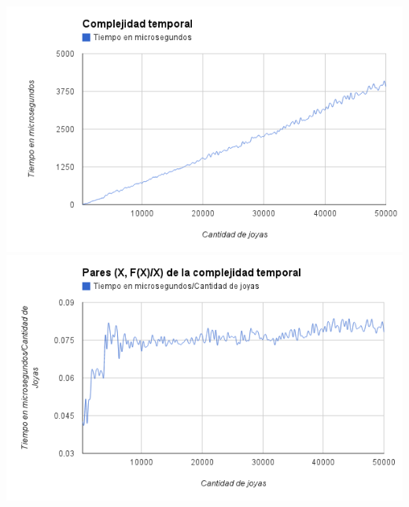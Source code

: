 \begin{center}
	\includegraphics[scale=0.60]{images/ej2_fx.png}
	\includegraphics[scale=0.60]{images/ej2_fx_x.png}
\end{center}

